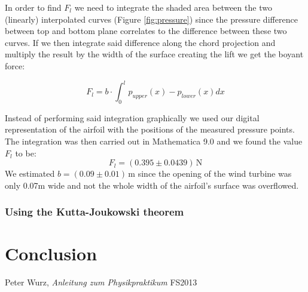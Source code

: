 \documentclass{scrreprt}
\newcommand{\unit}[1]{\ensuremath{\, \mathrm{#1}}}
\begin{document}
In order to find $F_l$ we need to integrate the shaded area between the two (linearly) interpolated curves (Figure \ref{fig:pressure}) since the pressure difference between top and bottom plane correlates to the difference between these two curves. If we then integrate said difference along the chord projection and multiply the result by the width of the surface creating the lift we get the boyant force:

\begin{equation}
F_l = b \cdot \int_0^l{p_{upper}(x)-p_{lower}(x)dx}
\end{equation}

Instead of performing said integration graphically we used our digital representation of the airfoil with the positions of the measured pressure points. The integration was then carried out in Mathematica 9.0 and we found the value $F_l$ to be:
\[F_l = (0.395 \pm 0.0439) \unit{N}\]
We estimated $b=(0.09 \pm 0.01)\unit{m}$ since the opening of the wind turbine was only 0.07m wide and not the whole width of the airfoil's surface was overflowed.


\subsubsection{Using the Kutta-Joukowski theorem}


\section{Conclusion}

\begin{thebibliography}{9}

  Peter Wurz,
  \emph{Anleitung zum Physikpraktikum}
  FS2013

\end{thebibliography}
\end{document}
